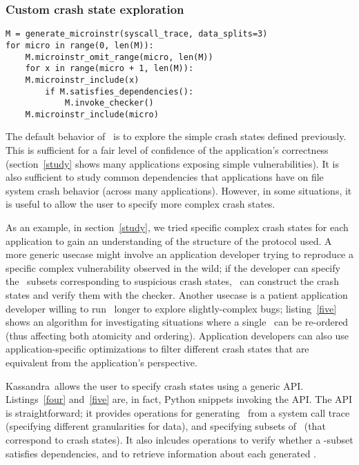 \subsubsection{Custom crash state exploration}

\begin{lstlisting}[float=t, caption = {\textbf{Algorithm for \microinstruction\ re-ordering.}}, label = {five}, escapechar=!]
M = generate_microinstr(syscall_trace, data_splits=3)
for micro in range(0, len(M)):
    M.microinstr_omit_range(micro, len(M))
    for x in range(micro + 1, len(M)):
	M.microinstr_include(x)
        if M.satisfies_dependencies():
            M.invoke_checker()
    M.microinstr_include(micro)
\end{lstlisting}

The default behavior of \Kassandra\ is to explore the simple crash states defined previously. This is sufficient for a fair level of confidence of the application's correctness (section~\ref{study} shows many applications exposing simple vulnerabilities). It is also sufficient to study common dependencies that applications have on file system crash behavior (across many applications). However, in some situations, it is useful to allow the user to specify more complex crash states.

As an example, in section~\ref{study}, we tried specific complex crash states for each application to gain an understanding of the structure of the protocol used. A more generic usecase might involve an application developer trying to reproduce a specific complex vulnerability observed in the wild; if the developer can specify the \microinstruction\ subsets corresponding to suspicious crash states, \Kassandra\ can construct the crash states and verify them with the checker. Another usecase is a patient application developer willing to run \Kassandra\ longer to explore slightly-complex bugs; listing~\ref{five} shows an algorithm for investigating situations where a single \microinstruction\ can be re-ordered (thus affecting both atomicity and ordering). Application developers can also use application-specific optimizations to filter different crash states that are equivalent from the application's perspective.

Kassandra\ allows the user to specify crash states using a generic API. Listings~\ref{four} and~\ref{five} are, in fact, Python snippets invoking the API. The API is straightforward; it provides operations for generating \microinstruction\ from a system call trace (specifying different granularities for data), and specifying subsets of \microinstructions\ (that correspond to crash states). It also inlcudes operations to verify whether a \microinstruction-subset satisfies dependencies, and to retrieve information about each generated \microinstruction.

